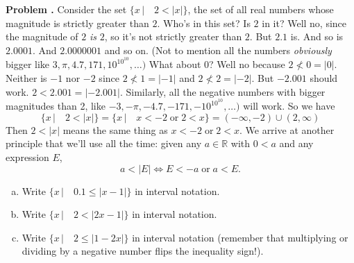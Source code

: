 \documentclass[11pt,letterpaper]{article}
\newcounter{problem}
\newcommand{\problem}{
	\stepcounter{problem}%
	\noindent \textbf{Problem \theproblem. }%
}
\begin{document}
\vspace{.5cm}



\problem Consider the set $\{ x \, | \quad 2 < |x|\}$, the set of all real numbers whose magnitude is strictly greater than $2$. Who's in this set? Is $2$ in it? Well no, since the magnitude of $2$ \textit{is} $2$, so it's not strictly greater than $2$. But $2.1$ is. And so is $2.0001$. And $2.0000001$ and so on. (Not to mention all the numbers \textit{obviously} bigger like $3, \pi, 4.7, 171, 10^{10^{10}}, \dots)$ What about $0$? Well no because $2 \not < 0 = |0|$. Neither is $-1$ nor $-2$ since $2 \not < 1 = |-1|$ and $2 \not < 2 = |-2|$. But $-2.001$ should work. $2 < 2.001 = |-2.001|$. Similarly, all the negative numbers with bigger magnitudes than 2, like $-3, -\pi, -4.7, -171, -10^{10^{10}}, \dots)$ will work. So we have
$$ \{ x \, | \quad 2 < |x|\} = \{ x \, | \quad x < -2 \; \text{or} \; 2 < x\} = (-\infty, -2) \cup (2, \infty)$$
\noindent Then $2 < |x|$ means the same thing as $x < -2 \; \text{or} \; 2 < x$. We arrive at another principle that we'll use all the time: given any $a \in \mathbb{R}$ with $0<a$ and any expression $E$, 
\begin{equation}a < |E| \Leftrightarrow E < -a \; \text{or} \; a < E. \end{equation}
\begin{enumerate}[(a)]
	\item Write $\{ x \, | \quad 0.1 \le |x-1| \}$ in interval notation.
	\item Write $\{ x \, | \quad 2 <  |2x-1|\}$ in interval notation.
	\item Write $\{ x \, | \quad 2 \le |1-2x|\}$ in interval notation (remember that multiplying or dividing by a negative number flips the inequality sign!).
\end{enumerate} 

\vspace{.5cm}

\end{document}
